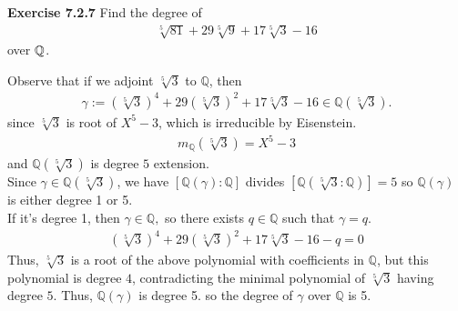 \documentclass{article}
\begin{document}
\begin{homeworkProblem}
    
    

    
    
    
    


    

    
    
    

    
    
    
    

    





\end{homeworkProblem}

\pagebreak


\begin{homeworkProblem}
    \textbf{Exercise 7.2.7} Find the degree of 
    \begin{align}
        \sqrt[5]{81} + 29\sqrt[5]{9} + 17\sqrt[5]{3} - 16
    \end{align}
    over $\mathbb{Q}$.

    \solution

    Observe that if we adjoint $\sqrt[5]{3}$ to $\mathbb{Q}$, then 
    \begin{align}
        \gamma := (\sqrt[5]{3})^4 + 29 (\sqrt[5]{3})^2 + 17 \sqrt[5]{3} - 16 \in \mathbb{Q}(\sqrt[5]{3}).
    \end{align}
    since $\sqrt[5]{3}$ is root of $X^5 - 3$, which is irreducible by Eisenstein.
    \begin{align}
        m_{\mathbb{Q}}(\sqrt[5]{3}) = X^5 - 3
    \end{align}
    and $\mathbb{Q}(\sqrt[5]{3})$ is degree $5$ extension.\\
    Since $\gamma \in \mathbb{Q}(\sqrt[5]{3})$, we have
    $[\mathbb{Q}(\gamma) : \mathbb{Q}]$ divides $[\mathbb{Q}(\sqrt[5]{3}:\mathbb{Q})]=5$
    so $\mathbb{Q}(\gamma)$ is either degree 1 or 5.\\
    If it's degree 1, then $\gamma \in \mathbb{Q},$ so there exists $q \in \mathbb{Q}$ such that 
    $\gamma = q$.
    \begin{align}
        \left( \sqrt[5]{3} \right)^4 + 29 \left( \sqrt[5]{3} \right)^2 + 17 \sqrt[5]{3} - 16 - q = 0
    \end{align}
    Thus, $\sqrt[5]{3}$ is a root of the above polynomial with coefficients in $\mathbb{Q}$,
    but this polynomial is degree $4$, contradicting the minimal polynomial 
    of $\sqrt[5]{3}$ having degree $5$.
    Thus, $\mathbb{Q}(\gamma)$ is degree 5. so the degree of $\gamma$ over $\mathbb{Q}$ is 5.

    


    
    

\end{homeworkProblem}
\end{document}
